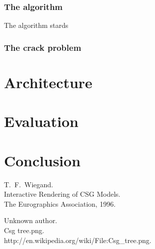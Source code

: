 \documentclass[a4paper,10pt,twoside]{report}
\begin{document}
\subsection{The algorithm}
The algorithm stards 


\subsection{The crack problem}

\chapter{Architecture}

\chapter{Evaluation}

\chapter{Conclusion}


\begin{thebibliography}{99}
    T.~F.~Wiegand.\\
    Interactive Rendering of CSG Models.\\
    The Eurographics Association, 1996.

    Unknown author.\\
    Csg tree.png.\\
    http://en.wikipedia.org/wiki/File:Csg\_tree.png.\\
\end{thebibliography}
\end{document}
